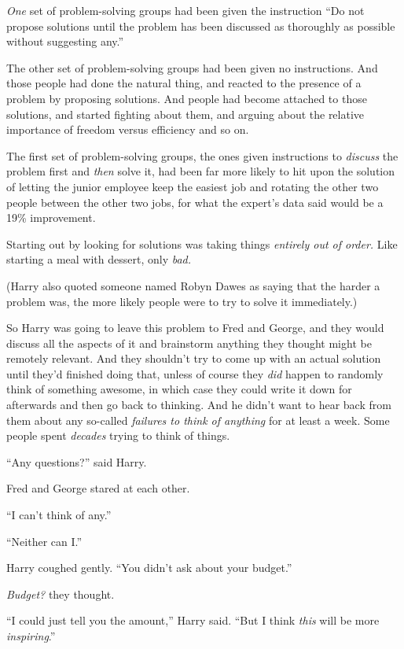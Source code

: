 \emph{One} set of problem-solving groups had been given the instruction “Do not propose solutions until the problem has been discussed as thoroughly as possible without suggesting any.”

The other set of problem-solving groups had been given no instructions. And those people had done the natural thing, and reacted to the presence of a problem by proposing solutions. And people had become attached to those solutions, and started fighting about them, and arguing about the relative importance of freedom versus efficiency and so on.

The first set of problem-solving groups, the ones given instructions to \emph{discuss} the problem first and \emph{then} solve it, had been far more likely to hit upon the solution of letting the junior employee keep the easiest job and rotating the other two people between the other two jobs, for what the expert’s data said would be a 19\% improvement.

Starting out by looking for solutions was taking things \emph{entirely out of order.} Like starting a meal with dessert, only \emph{bad.}

(Harry also quoted someone named Robyn Dawes as saying that the harder a problem was, the more likely people were to try to solve it immediately.)

So Harry was going to leave this problem to Fred and George, and they would discuss all the aspects of it and brainstorm anything they thought might be remotely relevant. And they shouldn’t try to come up with an actual solution until they’d finished doing that, unless of course they \emph{did} happen to randomly think of something awesome, in which case they could write it down for afterwards and then go back to thinking. And he didn’t want to hear back from them about any so-called \emph{failures to think of anything} for at least a week. Some people spent \emph{decades} trying to think of things.

“Any questions?” said Harry.

Fred and George stared at each other.

“I can’t think of any.”

“Neither can I.”

Harry coughed gently. “You didn’t ask about your budget.”

\emph{Budget?} they thought.

“I could just tell you the amount,” Harry said. “But I think \emph{this} will be more \emph{inspiring}.”

